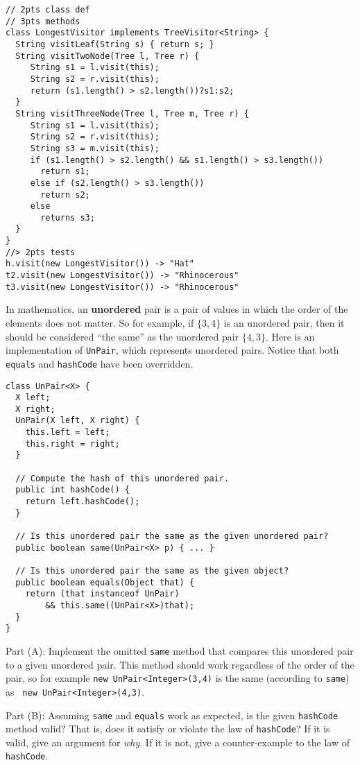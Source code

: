 \documentclass[12pt]{article}                   %
\def\pts#1{\marginpar{\footnotesize \raggedright  \fbox{#1 {\sc Points}}}}
\newenvironment{solution}{\color{red}}{}
\begin{document}
\begin{problem}
\begin{solution}
\begin{verbatim}
// 2pts class def
// 3pts methods
class LongestVisitor implements TreeVisitor<String> {
  String visitLeaf(String s) { return s; }
  String visitTwoNode(Tree l, Tree r) { 
     String s1 = l.visit(this);
     String s2 = r.visit(this);
     return (s1.length() > s2.length())?s1:s2;
  }
  String visitThreeNode(Tree l, Tree m, Tree r) { 
     String s1 = l.visit(this);
     String s2 = r.visit(this);
     String s3 = m.visit(this);
     if (s1.length() > s2.length() && s1.length() > s3.length())
       return s1;
     else if (s2.length() > s3.length())
       return s2;
     else
       returns s3;
  }
}
//> 2pts tests
h.visit(new LongestVisitor()) -> "Hat"
t2.visit(new LongestVisitor()) -> "Rhinocerous"
t3.visit(new LongestVisitor()) -> "Rhinocerous"
\end{verbatim}
\end{solution}

\newpage

\end{problem}



\begin{problem} \pts{15}

In mathematics, an {\bf unordered} pair is a pair of values in which
the order of the elements does not matter.  So for example, if
$\{3,4\}$ is an unordered pair, then it should be considered ``the
same'' as the unordered pair $\{4,3\}$.  Here is an implementation of
{\tt UnPair}, which represents unordered pairs.  Notice that both {\tt
  equals} and {\tt hashCode} have been overridden.

\begin{verbatim}
class UnPair<X> {
  X left;
  X right;
  UnPair(X left, X right) {
    this.left = left;
    this.right = right;
  }

  // Compute the hash of this unordered pair.
  public int hashCode() {
    return left.hashCode();
  }

  // Is this unordered pair the same as the given unordered pair?
  public boolean same(UnPair<X> p) { ... }

  // Is this unordered pair the same as the given object?
  public boolean equals(Object that) {
    return (that instanceof UnPair)
        && this.same((UnPair<X>)that);
  }
}
\end{verbatim}

\newpage
\noindent
Part (A): Implement the omitted {\tt same} method that compares this
unordered pair to a given unordered pair.  This method should work
regardless of the order of the pair, so for example {\tt new
  UnPair<Integer>(3,4)} is the same (according to {\tt same}) as {\tt
  new UnPair<Integer>(4,3)}.

\newpage
\noindent
Part (B): Assuming {\tt same} and {\tt equals} work as expected, is
the given {\tt hashCode} method valid?  That is, does it satisfy or
violate the law of {\tt hashCode}?  If it is valid, give an argument
for \emph{why}.  If it is not, give a counter-example to the law of
{\tt hashCode}.
\end{problem}
\newpage
\end{document}
